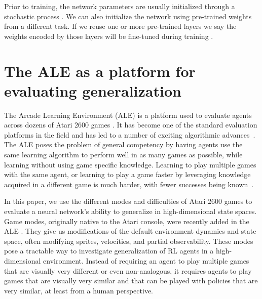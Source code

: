 \documentclass{article}
\begin{document}
Prior to training, the network parameters are usually initialized through a stochastic process \citep[e.g., Xavier initialization;][]{Glorot10}.
We can also initialize the network using pre-trained weights from a different task.
If we reuse one or more pre-trained layers we say the weights encoded by those layers will be fine-tuned during training \citep[e.g.,][]{Razavian14, Long15}.


\section{The ALE as a platform for evaluating generalization}



The Arcade Learning Environment (ALE) is a platform used to evaluate agents across dozens of Atari 2600 games \citep{Bellemare13}. It has become one of the standard evaluation platforms in the field and has led to a number of exciting algorithmic advances~\citep[e.g.,][]{Mnih15}.
The ALE poses the problem of general competency by having agents use the same learning algorithm to perform well in as many games as possible, while learning without using game specific knowledge.
Learning to play multiple games with the same agent, or learning to play a game faster by leveraging knowledge acquired in a different game is much harder, with fewer successes being known~\citep[e.g.,][]{Rusu16, Kirkpatrick16, Parisotto16, Schwarz18,Espeholt18}.

In this paper, we use the different modes and difficulties of Atari 2600 games to evaluate a neural network's ability to generalize in high-dimensional state spaces. Game modes, originally native to the Atari console, were recently added in the ALE \citep{Machado18}.
They give us modifications of the default environment dynamics and state space, often modifying sprites, velocities, and partial observability. These modes pose a tractable way to investigate generalization of RL agents in a high-dimensional environment. Instead of requiring an agent to play multiple games that are visually very different or even non-analogous, it requires agents to play games that are visually very similar and that can be played with policies that are very similar, at least from a human perspective.
\end{document}
